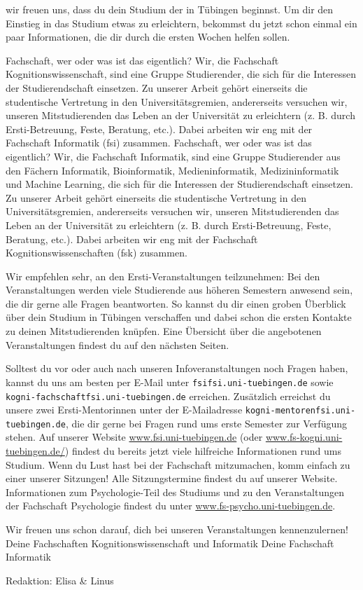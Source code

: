 \thispagestyle{firststyle}
wir freuen uns, dass du dein Studium der \studiengang in Tübingen beginnst.
Um dir den Einstieg in das Studium etwas zu erleichtern, bekommst du jetzt schon einmal
ein paar Informationen, die dir durch die ersten Wochen helfen sollen.

\ifkogwiss
\glqq Fachschaft\grqq, wer oder was ist das eigentlich? Wir, die Fachschaft Kognitionswissenschaft, 
sind eine Gruppe Studierender, die sich für die Interessen der Studierendschaft einsetzen. Zu unserer Arbeit
gehört einerseits die studentische Vertretung in den Universitätsgremien, andererseits versuchen wir, unseren
Mitstudierenden das Leben an der Universität zu erleichtern (z. B. durch Ersti-Betreuung, Feste, Beratung, etc.). 
Dabei arbeiten wir eng mit der Fachschaft Informatik (fsi) zusammen.
\else
\glqq Fachschaft\grqq, wer oder was ist das eigentlich? Wir, die Fachschaft Informatik, sind eine Gruppe Studierender aus den Fächern
Informatik, Bioinformatik, Medieninformatik, Medizininformatik und Machine Learning, die sich für die Interessen der Studierendschaft einsetzen. Zu unserer Arbeit
gehört einerseits die studentische Vertretung in den Universitätsgremien, andererseits versuchen wir, unseren
Mitstudierenden das Leben an der Universität zu erleichtern (z. B. durch Ersti-Betreuung, Feste, Beratung, etc.). 
Dabei arbeiten wir eng mit der Fachschaft Kognitionswissenschaften (fsk) zusammen.
\fi

Wir empfehlen sehr, an den Ersti-Veranstaltungen teilzunehmen: 
Bei den Veranstaltungen werden viele Studierende aus höheren Semestern anwesend sein, die dir gerne alle Fragen beantworten. 
So kannst du dir einen groben Überblick über dein Studium in Tübingen verschaffen und dabei schon die ersten Kontakte zu deinen Mitstudierenden knüpfen.
Eine Übersicht über die angebotenen Veranstaltungen findest du auf den nächsten Seiten.

Solltest du vor oder auch nach unseren Infoveranstaltungen noch Fragen haben, kannst du uns
am besten per E-Mail unter \texttt{fsi\At fsi.uni-tuebingen.de}
\ifkogwiss
sowie \texttt{kogni-fachschaft\At fsi.uni-tuebingen.de}
\fi
erreichen.
\ifkogwiss
Zusätzlich erreichst du unsere zwei Ersti-Mentorinnen unter der E-Mailadresse \texttt{kogni-mentoren\At fsi.uni-tuebingen.de}, die dir gerne bei Fragen rund ums erste Semester zur Verfügung stehen.
\fi
Auf unserer Website \url{www.fsi.uni-tuebingen.de} (oder \url{www.fs-kogni.uni-tuebingen.de/}) findest du bereits
jetzt viele hilfreiche Informationen rund ums Studium. Wenn du Lust hast bei der Fachschaft mitzumachen,
komm einfach zu einer unserer Sitzungen! Alle Sitzungstermine findest du auf unserer Website.
\ifkogwiss  Informationen zum Psychologie-Teil des Studiums und zu den Veranstaltungen der
Fachschaft Psychologie findest du unter \url{www.fs-psycho.uni-tuebingen.de}.\fi

Wir freuen uns schon darauf, dich bei unseren Veranstaltungen kennenzulernen!\\
\ifkogwiss
Deine Fachschaften Kognitionswissenschaft und Informatik
\else
Deine Fachschaft Informatik
\par\hfill
{\footnotesize Redaktion: Elisa \& Linus}
\fi
\vfill
